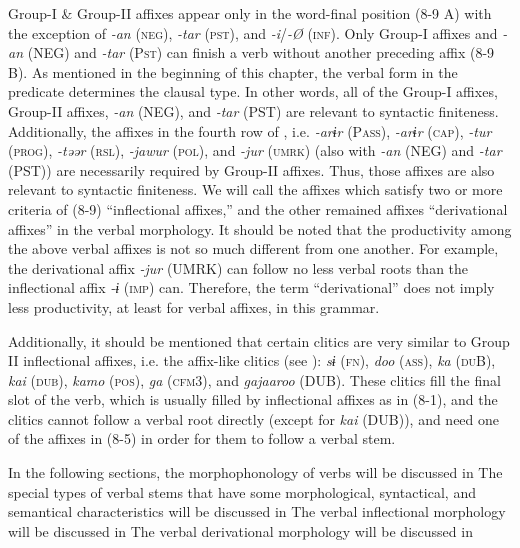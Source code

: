 Group-I \& Group-II affixes appear only in the word-final position (8-9 A) with the exception of \textit{{}-an} (\textsc{neg}), \textit{{}-tar} (\textsc{pst}), and \textit{{}-i}/\textit{{}-Ø} (\textsc{inf}). Only Group-I affixes and \textit{{}-an} (NEG) and \textit{-tar} (P\textsc{st}) can finish a verb without another preceding affix (8-9 B). As mentioned in the beginning of this chapter, the verbal form in the predicate determines the clausal type. In other words, all of the Group-I affixes, Group-II affixes, \textit{{}-an} (NEG), and \textit{-tar} (PST) are relevant to syntactic finiteness. Additionally, the affixes in the fourth row of , i.e. \textit{{}-arɨr} (P\textsc{ass}), \textit{-arɨr} (\textsc{cap}), \textit{-tur} (\textsc{prog}), \textit{{}-təər} (\textsc{rsl}), \textit{{}-jawur} (\textsc{pol}), and \textit{{}-jur} (\textsc{umrk}) (also with \textit{{}-an} (NEG) and \textit{{}-tar} (PST)) are necessarily required by Group-II affixes. Thus, those affixes are also relevant to syntactic finiteness. We will call the affixes which satisfy two or more criteria of (8-9) “inflectional affixes,” and the other remained affixes “derivational affixes” in the verbal morphology. It should be noted that the productivity among the above verbal affixes is not so much different from one another. For example, the derivational affix \textit{{}-jur} (UMRK) can follow no less verbal roots than the inflectional affix \textit{{}-ɨ} (\textsc{imp}) can. Therefore, the term “derivational” does not imply less productivity, at least for verbal affixes, in this grammar.

  Additionally, it should be mentioned that certain clitics are very similar to Group II inflectional affixes, i.e. the affix-like clitics (see ): \textit{sɨ} (\textsc{fn}), \textit{doo} (\textsc{ass}), \textit{ka} (\textsc{du}B), \textit{kai} (\textsc{dub}), \textit{kamo} (\textsc{pos}), \textit{ga} (\textsc{cfm}3), and \textit{gajaaroo} (DUB). These clitics fill the final slot of the verb, which is usually filled by inflectional affixes as in (8-1), and the clitics cannot follow a verbal root directly (except for \textit{kai} (DUB)), and need one of the affixes in (8-5) in order for them to follow a verbal stem.

  In the following sections, the morphophonology of verbs will be discussed in  The special types of verbal stems that have some morphological, syntactical, and semantical characteristics will be discussed in  The verbal inflectional morphology will be discussed in  The verbal derivational morphology will be discussed in 

